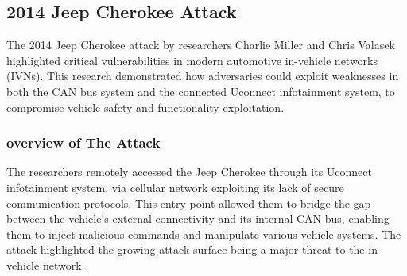 \documentclass{report}
\begin{document}

\subsection{2014 Jeep Cherokee Attack}
The 2014 Jeep Cherokee attack by researchers Charlie Miller and Chris Valasek highlighted critical vulnerabilities in modern automotive in-vehicle networks (IVNs).\cite{valasek2014survey} This research demonstrated how adversaries could exploit weaknesses in both the CAN bus system and the connected Uconnect infotainment system, to compromise vehicle safety and functionality exploitation.
\subsubsection{overview of The Attack}
The researchers remotely accessed the Jeep Cherokee through its Uconnect infotainment system,  via cellular network exploiting its lack of secure communication protocols. This entry point allowed them to bridge the gap between the vehicle's external connectivity and its internal CAN bus, enabling them to inject malicious commands and manipulate various vehicle systems. The attack highlighted the growing attack surface being a major threat to the  in-vehicle network.
\end{document}
